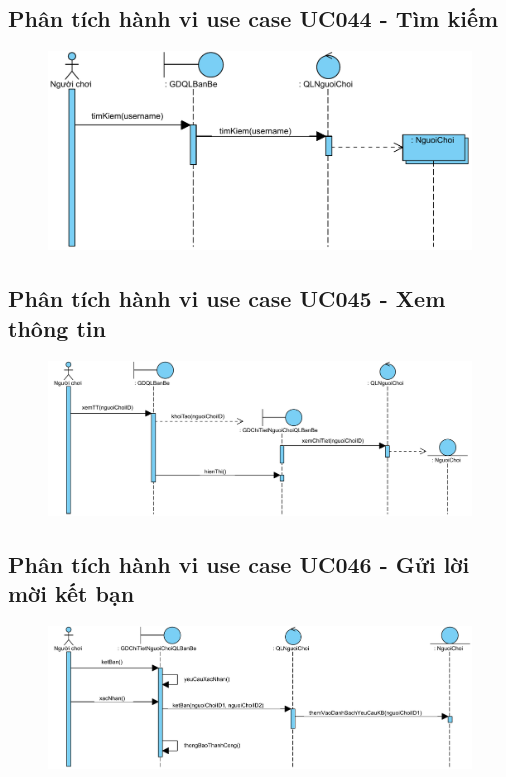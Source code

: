 \documentclass[3p]{elsarticle}
\begin{document}
\subsection{Phân tích hành vi use case UC044 - Tìm kiếm}
\begin{figure}[!htbp]
	\hspace*{-.5in}
	\centering
	\includegraphics[scale=.55]{images/sequence-pdfs/gamer/FriendManagement_Search.pdf}
\end{figure}
\subsection{Phân tích hành vi use case UC045 - Xem thông tin}
\begin{figure}[!htbp]
	\hspace*{-.5in}
	\centering
	\includegraphics[scale=.55]{images/sequence-pdfs/gamer/FriendManagement_ViewInfo.pdf}
\end{figure}
\newpage

\subsection{Phân tích hành vi use case UC046 - Gửi lời mời kết bạn}
\begin{figure}[!htbp]
	\hspace*{-.5in}
	\centering
	\includegraphics[scale=.55]{images/sequence-pdfs/gamer/FriendManagement_Request.pdf}
\end{figure}
\end{document}
